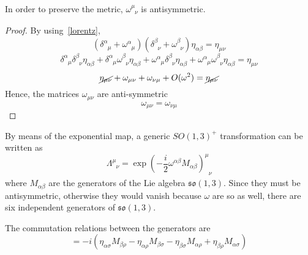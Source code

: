     In order to preserve the metric, $\omega^{\mu}_{\phantom \mu \nu}$ is antisymmetric.
    \begin{proof}
        By using~\eqref{lorentz},
        \begin{equation*}
            (\delta^{\alpha}_{\phantom \alpha \mu} + \omega^{\alpha}_{\phantom \alpha \mu} )( \delta^{\beta}_{\phantom \beta \nu} + \omega^{\beta}_{\phantom \beta \nu} )\eta_{\alpha \beta} = \eta_{\mu \nu}
        \end{equation*}
        \begin{equation*}
            \delta^{\alpha}_{\phantom \alpha \mu} \delta^{\beta}_{\phantom \beta \nu} \eta_{\alpha \beta} + \delta^{\alpha}_{\phantom \alpha \mu} \omega^{\beta}_{\phantom \beta \nu} \eta_{\alpha \beta} + \omega^{\alpha}_{\phantom \alpha \mu} \delta^{\beta}_{\phantom \beta \nu} \eta_{\alpha \beta} + \omega^{\alpha}_{\phantom \alpha \mu} \omega^{\beta}_{\phantom \beta \nu} \eta_{\alpha \beta} = \eta_{\mu \nu}
        \end{equation*}
        \begin{equation*}
            \cancel{\eta_{\mu \nu}} + \omega_{\mu \nu} + \omega_{\nu\mu} + O(\omega^2) = \cancel{\eta_{\mu \nu}}
        \end{equation*}
        Hence, the matrices $\omega_{\mu\nu}$ are anti-symmetric
        \begin{equation*}
            \omega_{\mu \nu} = \omega_{\nu \mu}
        \end{equation*}
    \end{proof}

    By means of the exponential map, a generic $SO(1,3)^+$ transformation can be written as
    \begin{equation*}
        \Lambda^{\mu}_{\phantom \mu \nu} = \exp(- \frac{i}{2} \omega^{\alpha \beta} M_{\alpha \beta})^\mu_{\phantom \mu \nu}
    \end{equation*}
    where $M_{\alpha \beta}$ are the generators of the Lie algebra $\mathfrak{so} (1,3)$. Since they must be antisymmetric, otherwise they would vanish because $\omega$ are so as well, there are six independent generators of $\mathfrak{so} (1,3)$.


    The commutation relations between the generators are
    \begin{equation*}
        [M_{\alpha\beta}, M_{\sigma\rho}] = - i (\eta_{\alpha\sigma} M_{\beta \rho} - \eta_{\alpha\rho} M_{\beta\sigma} - \eta_{\beta\sigma} M_{\alpha\rho} + \eta_{\beta \rho} M_{\alpha \sigma})
    \end{equation*}

